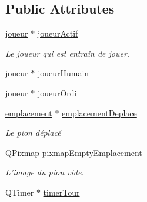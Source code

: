 \subsection*{Public Attributes}
\begin{DoxyCompactItemize}
\item 
\hyperlink{classjoueur}{joueur} $\ast$ \hyperlink{class_main_window_a70a2607d9b49f3b5cd32afec1cb614a9}{joueur\-Actif}
\begin{DoxyCompactList}\small\item\em Le joueur qui est entrain de jouer. \end{DoxyCompactList}\item 
\hyperlink{classjoueur}{joueur} $\ast$ \hyperlink{class_main_window_ac8503f9eb4259016c7858e59aa31c1a4}{joueur\-Humain}
\item 
\hyperlink{classjoueur}{joueur} $\ast$ \hyperlink{class_main_window_acb5c1aad1ac317404027da04e4a175d3}{joueur\-Ordi}
\item 
\hypertarget{class_main_window_aa201a7ead9510f42427bd7b28e690df1}{\hyperlink{classemplacement}{emplacement} $\ast$ \hyperlink{class_main_window_aa201a7ead9510f42427bd7b28e690df1}{emplacement\-Deplace}}\label{class_main_window_aa201a7ead9510f42427bd7b28e690df1}

\begin{DoxyCompactList}\small\item\em Le pion déplacé \end{DoxyCompactList}\item 
\hypertarget{class_main_window_a40ca81795033b7d295527bc860f716cf}{Q\-Pixmap \hyperlink{class_main_window_a40ca81795033b7d295527bc860f716cf}{pixmap\-Empty\-Emplacement}}\label{class_main_window_a40ca81795033b7d295527bc860f716cf}

\begin{DoxyCompactList}\small\item\em L'image du pion vide. \end{DoxyCompactList}\item 
\hypertarget{class_main_window_abe41e7eada364f38acf9bfe58cc6eee3}{Q\-Timer $\ast$ \hyperlink{class_main_window_abe41e7eada364f38acf9bfe58cc6eee3}{timer\-Tour}}\label{class_main_window_abe41e7eada364f38acf9bfe58cc6eee3}


\end{DoxyCompactItemize}
